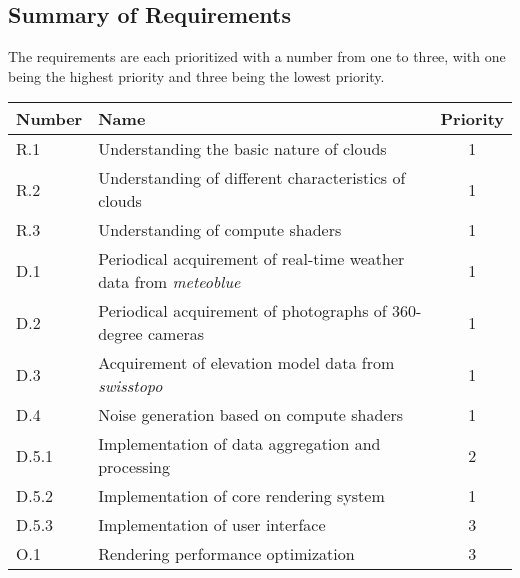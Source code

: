 \subsection{Summary of Requirements}
\label{section:requirements:summary}
The requirements are each prioritized with a number from one to three, with one being the highest priority and three being the lowest priority.
\emptyline
\noindent\begin{tabularx}{\textwidth}{|l|X|c|}
    \hline
    \textbf{Number} & \textbf{Name}                                                         & \textbf{Priority} \\ \hline
    R.1             & Understanding the basic nature of clouds                              & 1                 \\ \hline
    R.2             & Understanding of different characteristics of clouds                  & 1                 \\ \hline
    R.3             & Understanding of compute shaders                                      & 1                 \\ \hline
    D.1             & Periodical acquirement of real-time weather data from \emph{meteoblue}& 1                 \\ \hline
    D.2             & Periodical acquirement of photographs of 360-degree cameras           & 1                 \\ \hline
    D.3             & Acquirement of elevation model data from \emph{swisstopo}             & 1                 \\ \hline
    D.4             & Noise generation based on compute shaders                             & 1                 \\ \hline
    D.5.1           & Implementation of data aggregation and processing                     & 2                 \\ \hline
    D.5.2           & Implementation of core rendering system                               & 1                 \\ \hline
    D.5.3           & Implementation of user interface                                      & 3                 \\ \hline
    O.1             & Rendering performance optimization                                    & 3                 \\ \hline
\end{tabularx}